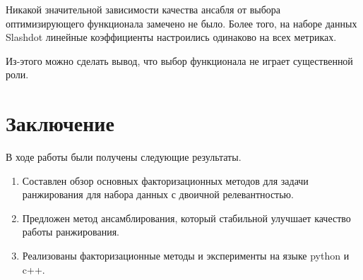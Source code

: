\documentclass[14pt]{extarticle}
\begin{document}
Никакой значительной зависимости качества ансабля от выбора оптимизирующего функционала замечено не было. Более того, на наборе данных Slashdot линейные коэффициенты настроились одинаково на всех метриках.

Из-этого можно сделать вывод, что выбор функционала не играет существенной роли. 

\section{Заключение}
В ходе работы были получены следующие результаты.

\begin{enumerate}

\item Составлен обзор основных факторизационных методов для задачи ранжирования для набора данных с двоичной релевантностью.

\item Предложен метод ансамблирования, который стабильной улучшает качество работы ранжирования.

\item Реализованы факторизационные методы  и эксперименты на языке python и c++.
\end{enumerate}




\newpage
\end{document}
